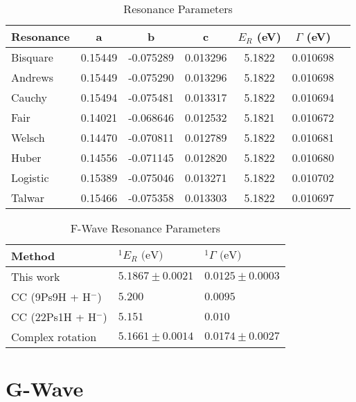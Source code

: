 \documentclass[Dissertation.tex]{subfiles}
\begin{document}
\setlength{\abovecaptionskip}{6pt}
\setlength{\belowcaptionskip}{6pt}
\begin{table}[H]
\centering
\begin{tabular}{l c c c c c c}
\toprule
Resonance & a & b & c & $E_R$ (eV) & $\Gamma$ (eV) \\
\midrule
Bisquare	& 0.15449 & -0.075289 & 0.013296 & 5.1822 & 0.010698 \\
Andrews		& 0.15449 & -0.075290 & 0.013296 & 5.1822 & 0.010698 \\
Cauchy		& 0.15494 & -0.075481 & 0.013317 & 5.1822 & 0.010694 \\
Fair			& 0.14021 & -0.068646 & 0.012532 & 5.1821 & 0.010672 \\ 
Welsch		& 0.14470 & -0.070811 & 0.012789 & 5.1822 & 0.010681 \\
Huber			& 0.14556 & -0.071145 & 0.012820 & 5.1822 & 0.010680 \\
Logistic	& 0.15389 & -0.075046 & 0.013271 & 5.1822 & 0.010702 \\ 
Talwar		& 0.15466 & -0.075358 & 0.013303 & 5.1822 & 0.010697 \\
\bottomrule
\end{tabular}
\caption{Resonance Parameters}
\label{tab:FWaveResonanceFull}
\end{table}


\setlength{\abovecaptionskip}{6pt}   %
\setlength{\belowcaptionskip}{6pt}   %
\begin{table}[H]
\centering
\begin{tabular}{l l l}
\toprule
Method & $^1E_R \text{ (eV)}$ & $^1\Gamma \text{ (eV)}$ \\
\midrule
This work & $5.1867 \pm 0.0021$ & $0.0125 \pm 0.0003$ \\
CC (9Ps9H + H$^-$) \cite{Walters2004} & $5.200$ & $0.0095$ \\
CC (22Ps1H + H$^-$) \cite{Blackwood2002b} & $5.151$ & $0.010$ \\
Complex rotation \cite{Ho2000} & $5.1661 \pm 0.0014$ & $0.0174 \pm 0.0027$  \\
\bottomrule
\end{tabular}
\caption{F-Wave Resonance Parameters}
\label{tab:FWaveResonanceComparisons}
\end{table}




\section{G-Wave}
\label{sec:GWave}
\end{document}
